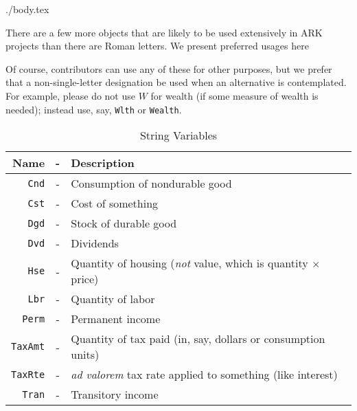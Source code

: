 \documentclass{econtex}
\begin{document}
\begin{verbatimwrite}{./body.tex}

There are a few more objects that are likely to be used extensively in ARK projects than there are Roman letters.  We present preferred usages here

Of course, contributors can use any of these for other purposes, but we prefer that a non-single-letter designation be used when an alternative is contemplated.  For example, please do not use $W$ for wealth (if some measure of wealth is needed); instead use, say, \texttt{Wlth} or \texttt{Wealth}. 

\begin{table}[h]
\begin{tabular}{||rcl||}
\hline
Name & - & Description 
 \\ \hline \texttt{Cnd}    & - & Consumption of nondurable good 
 \\  \texttt{Cst}    & - & Cost of something 
 \\  \texttt{Dgd}    & - & Stock of durable good
 \\  \texttt{Dvd}    & - & Dividends 
 \\  \texttt{Hse}    & - & Quantity of housing ({\it not} value, which is quantity $\times$ price)
 \\  \texttt{Lbr}    & - & Quantity of labor
 \\  \texttt{Perm}   & - & Permanent income
 \\  \texttt{TaxAmt} & - & Quantity of tax paid (in, say, dollars or consumption units)
 \\  \texttt{TaxRte} & - & {\it ad valorem} tax rate applied to something (like interest)
 \\  \texttt{Tran}   & - & Transitory income
\\ \hline
\end{tabular}
\caption{String Variables}
\label{table:Strings}
\end{table}

\end{verbatimwrite}

\end{document}

